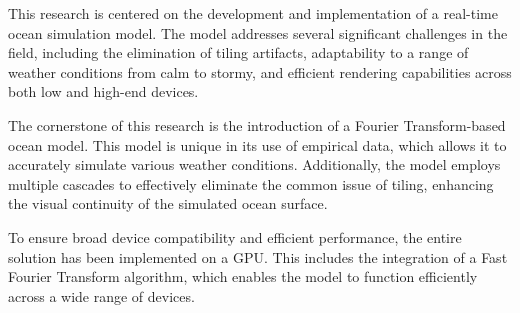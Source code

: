 \justifying

This research is centered on the development and implementation of a real-time ocean simulation model. The model addresses several significant challenges in the field, including the elimination of tiling artifacts, adaptability to a range of weather conditions from calm to stormy, and efficient rendering capabilities across both low and high-end devices.

The cornerstone of this research is the introduction of a Fourier Transform-based ocean model. This model is unique in its use of empirical data, which allows it to accurately simulate various weather conditions. Additionally, the model employs multiple cascades to effectively eliminate the common issue of tiling, enhancing the visual continuity of the simulated ocean surface.

To ensure broad device compatibility and efficient performance, the entire solution has been implemented on a GPU. This includes the integration of a Fast Fourier Transform algorithm, which enables the model to function efficiently across a wide range of devices.